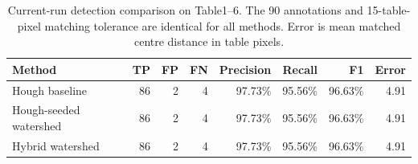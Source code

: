 \begin{table}[htbp]
\centering
\small
\caption{Current-run detection comparison on Table1--6. The 90 annotations and 15-table-pixel matching tolerance are identical for all methods. Error is mean matched centre distance in table pixels.}
\label{tab:watershed-summary}
\begin{tabular}{lrrrrrrr}
\toprule
Method & TP & FP & FN & Precision & Recall & F1 & Error \\
\midrule
Hough baseline & 86 & 2 & 4 & 97.73\% & 95.56\% & 96.63\% & 4.91 \\
Hough-seeded watershed & 86 & 2 & 4 & 97.73\% & 95.56\% & 96.63\% & 4.91 \\
Hybrid watershed & 86 & 2 & 4 & 97.73\% & 95.56\% & 96.63\% & 4.91 \\
\bottomrule
\end{tabular}
\end{table}
\FloatBarrier
